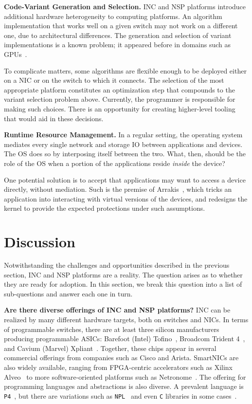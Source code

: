 \documentclass[11pt,dvipdfmx]{article}
\newcommand{\softsubsec}[1]{\vspace{0.6em}\noindent\textbf{#1}}
\begin{document}
\softsubsec{Code-Variant Generation and Selection.}
%
INC and NSP platforms introduce additional hardware heterogeneity to computing
platforms.
An algorithm implementation that works well on a given switch may not work on a
different one, due to architectural differences.
The generation and selection of variant implementations is a known problem; it
appeared before in domains such as GPUs~\cite{rosenfeld15}.


To complicate matters, some algorithms are flexible enough to be deployed either
on a NIC or on the switch to which it connects.
The selection of the most appropriate platform constitutes an optimization step
that compounds to the variant selection problem above.
Currently, the programmer is responsible for making such choices.
There is an opportunity for creating higher-level tooling that would aid in
these decisions.


\softsubsec{Runtime Resource Management.}
%
In a regular setting, the operating system mediates every single network and
storage IO between applications and devices.
The OS does so by interposing itself between the two.
What, then, should be the role of the OS when a portion of the applications
reside \emph{inside} the device?


One potential solution is to accept that applications may want to access a device
directly, without mediation.
Such is the premise of Arrakis~\cite{peter15}, which tricks an application into
interacting with virtual versions of the devices, and redesigns the kernel to
provide the expected protections under such assumptions.


\section{Discussion}
\label{sec:discussion}

Notwithstanding the challenges and opportunities described in the previous
section, INC and NSP platforms are a reality.
The question arises as to whether they are ready for adoption.
In this section, we break this question into a list of sub-questions and answer
each one in turn.


\softsubsec{Are there diverse offerings of INC and NSP platforms?}
%
INC can be realized by many different hardware targets, both on switches and
NICs.
In terms of programmable switches, there are at least three silicon
manufacturers producing programmable ASICs: Barefoot (Intel)
Tofino~\cite{barefoot}, Broadcom Trident 4~\cite{broadcomT4}, and Cavium
(Marvel) Xpliant~\cite{cavium}.
Together, these chips appear in several commercial offerings from companies such as
Cisco and Arista.
SmartNICs are also widely available, ranging from FPGA-centric accelerators such as
Xilinx Alveo~\cite{xilinx} to more software-oriented platforms such as
Netronome~\cite{netronome}.
The offering for programming languages and abstractions is also diverse.
A prevalent language is \texttt{P4}~\cite{bosshart14}, but there are variations
such as \texttt{NPL}~\cite{broadcomnpl} and even \texttt{C} libraries in some
cases~\cite{netronome}.
\end{document}
